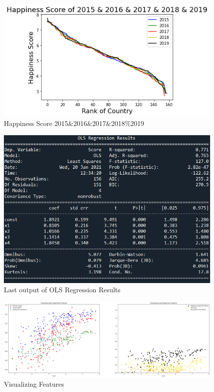 \documentclass[onecolumn]{article}
\begin{document}
\begin{figure}[htp]
\centering
\includegraphics[scale=0.60]{score.png}
\caption{Happiness Score 2015\&2016\&2017\&2018\%2019}
\end{figure}

\begin{figure}[htp]
\centering
\includegraphics[scale=0.60]{ols.png}
\caption{Last output of OLS Regression Results}
\end{figure}
\clearpage

\begin{figure}[htp]
\centering
\includegraphics[scale=0.25]{features.png}
\caption{Visualizing Features}
\end{figure}
\end{document}
